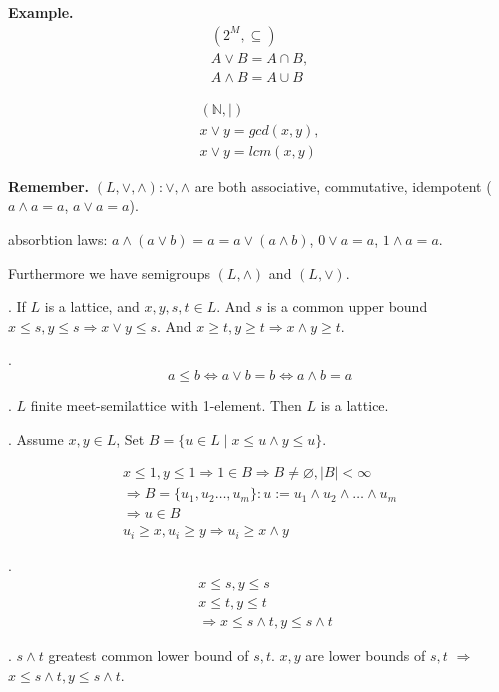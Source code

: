 \textbf{Example.}
\begin{align*}
  (2^M, \subseteq) \\
  A\vee B = A \cap B, \\
  A\wedge B = A \cup B
\end{align*}

\begin{align*}
  (\mathbb{N}, \mid) \\
  x \vee y = gcd(x,y), \\
  x \vee y = lcm(x,y)
\end{align*}

\textbf{Remember.}
$(L, \vee, \wedge): \vee, \wedge$ are both associative, commutative, idempotent ($a\wedge a = a$, $a\vee a = a$). 

absorbtion laws: $a \wedge(a \vee b) = a = a \vee ( a \wedge b)$, $0 \vee a = a$, $1 \wedge a = a$. 

Furthermore we have semigroups $(L, \wedge)$ and $(L, \vee)$.

\Lemma.
If $L$ is a lattice, and $x,y,s,t \in L$. And $s$ is a common upper bound $x \leq s, y \leq s \Rightarrow x \vee y \leq s$. 
And $x \geq t, y \geq t \Rightarrow x \wedge y \geq t$. 

\Remark.
\[
  a \leq b \Leftrightarrow a \vee b = b \Leftrightarrow a \wedge b = a
\]

\Lemma.
$L$ finite meet-semilattice with 1-element. Then $L$ is a lattice.

\Proof.
Assume $x,y \in L$, Set $B = \{u \in L \mid x \leq u \wedge y \leq u\}$. 

\begin{align*}
  x \leq 1, y \leq 1
    \Rightarrow 1 \in B \Rightarrow B \neq \varnothing, |B| < \infty \\
  \Rightarrow B= \{u_1, u_2 \ldots , u_m\}: 
    u:= u_1 \wedge u_2 \wedge \ldots \wedge u_m \\
  \Rightarrow u \in B \\
  u_i \geq x, u_i \geq y \Rightarrow u_i \geq x \wedge y
\end{align*}


\Lemma.
\begin{align*}
  &x \leq s, y \leq s \\
  &x \leq t, y \leq t \\
  &\Rightarrow x \leq s \wedge t, y \leq s \wedge t
\end{align*}

\Proof.
$s \wedge t$ greatest common lower bound of $s,t$. 
$x,y$ are lower bounds of $s,t$ $\Rightarrow$ $x \leq s \wedge t, y \leq s \wedge t$. 

